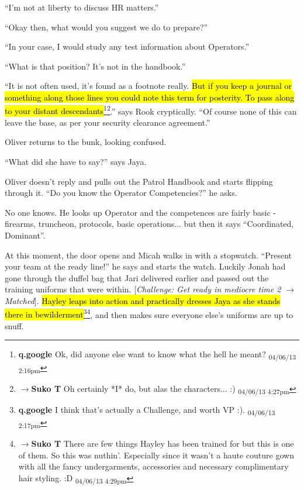 ``I'm not at liberty to discuss HR matters.''

``Okay then, what would you suggest we do to prepare?''

``In your case, I would study any test information about Operators.''

``What is that position?  It's not in the handbook.''

``It is not often used, it's found as a footnote really.  \hl{But if you keep a journal or something along those lines you could note this term for posterity.  To pass along to your distant descendants}\footnote{\textbf{q.google }Ok, did anyone else want to know what the hell he meant? \textsubscript{04/06/13 2:16pm}}\footnote{$\rightarrow$\textbf{Suko T }Oh certainly *I* do, but alas the characters... :) \textsubscript{04/06/13 4:27pm}}.'' says Rook cryptically.  ``Of course none of this can leave the base, as per your security clearance agreement.''



Oliver returns to the bunk, looking confused.

``What did she have to say?'' says Jaya.

Oliver doesn't reply and pulls out the Patrol Handbook and starts flipping through it.  ``Do you know the Operator Competencies?'' he asks.

No one knows.  He looks up Operator and the competences are fairly basic - firearms, truncheon, protocols, basic operations... but then it says ``Coordinated, Dominant''.



At this moment, the door opens and Micah walks in with a stopwatch.  ``Present your team at the ready line!'' he says and starts the watch.  Luckily Jonah had gone through the duffel bag that Jari delivered earlier and passed out the training uniforms that were within.  {[}\textit{Challenge: Get ready in mediocre time 2 $\rightarrow$ Matched}{]}.  \hl{Hayley leaps into action and practically dresses Jaya as she stands there in bewilderment}\footnote{\textbf{q.google }I think that's actually a Challenge, and worth VP :). \textsubscript{04/06/13 2:17pm}}\footnote{$\rightarrow$\textbf{Suko T }There are few things Hayley has been trained for but this is one of them.  So this was nuthin'.  Especially since it wasn't a haute couture gown with all the fancy undergarments, accessories and necessary complimentary hair styling. :D \textsubscript{04/06/13 4:29pm}}, and then makes sure everyone else's uniforms are up to snuff.



